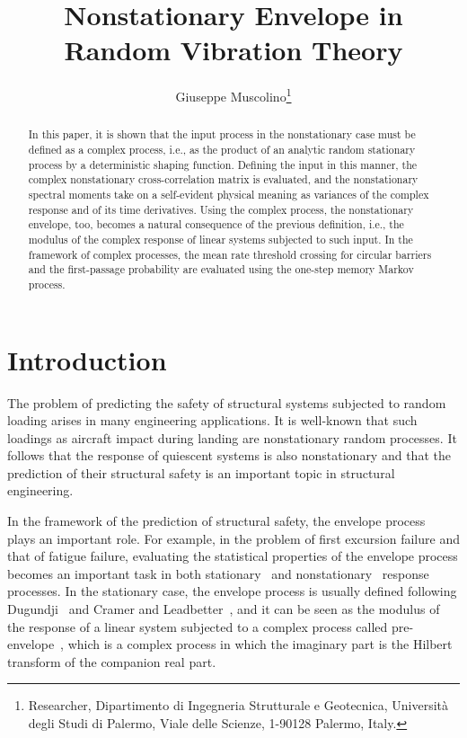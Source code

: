 \documentclass[12pt]{article}
\begin{document}
\title{Nonstationary Envelope in Random Vibration Theory}
\author{Giuseppe Muscolino\thanks{Researcher, Dipartimento di Ingegneria Strutturale e Geotecnica, Università degli Studi di Palermo, Viale delle Scienze, 1-90128 Palermo, Italy.}}
\date{}
\maketitle

\begin{abstract}
In this paper, it is shown that the input process in the nonstationary case must be defined as a complex process, i.e., as the product of an analytic random stationary process by a deterministic shaping function. Defining the input in this manner, the complex nonstationary cross-correlation matrix is evaluated, and the nonstationary spectral moments take on a self-evident physical meaning as variances of the complex response and of its time derivatives. Using the complex process, the nonstationary envelope, too, becomes a natural consequence of the previous definition, i.e., the modulus of the complex response of linear systems subjected to such input. In the framework of complex processes, the mean rate threshold crossing for circular barriers and the first-passage probability are evaluated using the one-step memory Markov process.
\end{abstract}

\section{Introduction}
The problem of predicting the safety of structural systems subjected to random loading arises in many engineering applications. It is well-known that such loadings as aircraft impact during landing are nonstationary random processes. It follows that the response of quiescent systems is also nonstationary and that the prediction of their structural safety is an important topic in structural engineering.

In the framework of the prediction of structural safety, the envelope process~\cite{langley1986} plays an important role. For example, in the problem of first excursion failure and that of fatigue failure, evaluating the statistical properties of the envelope process becomes an important task in both stationary~\cite{yang1971} and nonstationary~\cite{yang1972} response processes. In the stationary case, the envelope process is usually defined following Dugundji~\cite{dugundji1958} and Cramer and Leadbetter~\cite{cramer1967}, and it can be seen as the modulus of the response of a linear system subjected to a complex process called pre-envelope~\cite{arens1957, dugundji1958}, which is a complex process in which the imaginary part is the Hilbert transform of the companion real part.
\end{document}
